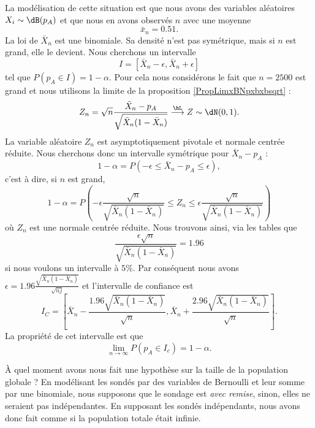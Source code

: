 La modélisation de cette situation est que nous avons des variables aléatoires \( X_i\sim\dB(p_A)\) et que nous en avons observés \( n\) avec une moyenne
\begin{equation}
    \bar x_n=0.51.
\end{equation}
La loi de \( \bar X_n\) est une binomiale. Sa densité n'est pas symétrique, mais si \( n\) est grand, elle le devient. Nous cherchons un intervalle 
\begin{equation}
    I=[\bar X_n-\epsilon,\bar X_n+\epsilon]
\end{equation}
tel que \( P(p_A\in I)=1-\alpha\). Pour cela nous considérons le fait que \( n=2500\) est grand et nous utilisons la limite de la proposition \ref{PropLimxBNpxbxbsqrt} :
\begin{equation}
    Z_n=\sqrt{n}\frac{ \bar X_n-p_A }{ \sqrt{\bar X_n(1-\bar X_n)} }\stackrel{\hL}{\longrightarrow}Z\sim\dN(0,1).
\end{equation}
La variable aléatoire \( Z_n\) est asymptotiquement pivotale et normale centrée réduite. Nous cherchons donc un intervalle symétrique pour \( \bar X_n-p_A\) :
\begin{equation}
    1-\alpha=P(-\epsilon\leq \bar X_n-p_A\leq \epsilon),
\end{equation}
c'est à dire, si \( n\) est grand, 
\begin{equation}
    1-\alpha=P\left( -\epsilon\frac{ \sqrt{n} }{ \sqrt{\bar X_n(1-\bar X_n)} }\leq Z_n\leq\epsilon\frac{ \sqrt{n} }{ \sqrt{\bar X_n(1-\bar X_n)} } \right)
\end{equation}
où \( Z_n\) est une normale centrée réduite. Nous trouvons ainsi, via les tables que
\begin{equation}
    \frac{ \epsilon\sqrt{n} }{ \sqrt{\bar X_n(1-\bar X_n)} }=1.96
\end{equation}
si nous voulons un intervalle à \( 5\%\). Par conséquent nous avons \( \epsilon=1.96\frac{ \sqrt{\bar X_n(1-\bar X_n)} }{ \sqrt{nj} }\) et l'intervalle de confiance est 
\begin{equation}
    I_C=\left[ \bar X_n-\frac{ 1.96\sqrt{\bar X_n(1-\bar X_n)} }{ \sqrt{n} },\bar X_n+\frac{ 2.96\sqrt{\bar X_n(1-\bar X_n)} }{ \sqrt{n} } \right].
\end{equation}
La propriété de cet intervalle est que
\begin{equation}
    \lim_{n\to \infty} P(p_A\in I_c)=1-\alpha.
\end{equation}

\begin{remark}
    À quel moment avons nous fait une hypothèse sur la taille de la population globale ? En modélisant les sondés par des variables de Bernoulli et leur somme par une binomiale, nous supposons que le sondage est \emph{avec remise}, sinon, elles ne seraient pas indépendantes. En supposant les sondés indépendants, nous avons donc fait comme si la population totale était infinie.
\end{remark}

